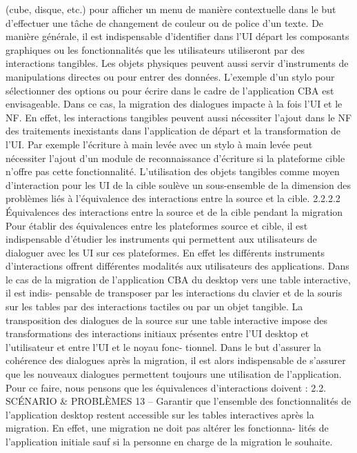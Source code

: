 \documentclass{article}
\begin{document}
(cube, disque, etc.) pour afﬁcher un menu de manière contextuelle dans le but d’effectuer une tâche de
changement de couleur ou de police d’un texte. De manière générale, il est indispensable d’identiﬁer
dans l’UI départ les composants graphiques ou les fonctionnalités que les utilisateurs utiliseront par
des interactions tangibles.
Les objets physiques peuvent aussi servir d’instruments de manipulations directes ou pour entrer
des données. L’exemple d’un stylo pour sélectionner des options ou pour écrire dans le cadre de
l’application CBA est envisageable. Dans ce cas, la migration des dialogues impacte à la fois l’UI et
le NF. En effet, les interactions tangibles peuvent aussi nécessiter l’ajout dans le NF des traitements
inexistants dans l’application de départ et la transformation de l’UI. Par exemple l’écriture à main
levée avec un stylo à main levée peut nécessiter l’ajout d’un module de reconnaissance d’écriture si la
plateforme cible n’offre pas cette fonctionnalité.
L’utilisation des objets tangibles comme moyen d’interaction pour les UI de la cible soulève un
sous-ensemble de la dimension des problèmes liés à l’équivalence des interactions entre la source et
la cible.
2.2.2.2
Équivalences des interactions entre la source et de la cible pendant la migration
Pour établir des équivalences entre les plateformes source et cible, il est indispensable d’étudier
les instruments qui permettent aux utilisateurs de dialoguer avec les UI sur ces plateformes. En effet
les différents instruments d’interactions offrent différentes modalités aux utilisateurs des applications.
Dans le cas de la migration de l’application CBA du desktop vers une table interactive, il est indis-
pensable de transposer par les interactions du clavier et de la souris sur les tables par des interactions
tactiles ou par un objet tangible.
La transposition des dialogues de la source sur une table interactive impose des transformations
des interactions initiaux présentes entre l’UI desktop et l’utilisateur et entre l’UI et le noyau fonc-
tionnel. Dans le but d’assurer la cohérence des dialogues après la migration, il est alors indispensable
de s’assurer que les nouveaux dialogues permettent toujours une utilisation de l’application. Pour ce
faire, nous pensons que les équivalences d’interactions doivent :
2.2. SCÉNARIO & PROBLÈMES
13
– Garantir que l’ensemble des fonctionnalités de l’application desktop restent accessible sur les
tables interactives après la migration. En effet, une migration ne doit pas altérer les fonctionna-
lités de l’application initiale sauf si la personne en charge de la migration le souhaite.
\end{document}
